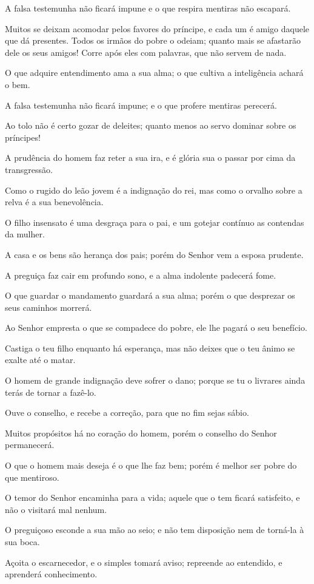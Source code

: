 A falsa testemunha não ficará impune e o que respira mentiras não
escapará.

Muitos se deixam acomodar pelos favores do príncipe, e cada um é
amigo daquele que dá presentes. Todos os irmãos do pobre o
odeiam; quanto mais se afastarão dele os seus amigos! Corre após
eles com palavras, que não servem de nada.

O que adquire entendimento ama a sua alma; o que cultiva a
inteligência achará o bem.

A falsa testemunha não ficará impune; e o que profere mentiras
perecerá.

Ao tolo não é certo gozar de deleites; quanto menos ao servo
dominar sobre os príncipes!

A prudência do homem faz reter a sua ira, e é glória sua o passar
por cima da transgressão.

Como o rugido do leão jovem é a indignação do rei, mas como o
orvalho sobre a relva é a sua benevolência.

O filho insensato é uma desgraça para o pai, e um gotejar
contínuo as contendas da mulher.

A casa e os bens são herança dos pais; porém do Senhor vem a
esposa prudente.

A preguiça faz cair em profundo sono, e a alma indolente padecerá
fome.

O que guardar o mandamento guardará a sua alma; porém o que
desprezar os seus caminhos morrerá.

Ao Senhor empresta o que se compadece do pobre, ele lhe pagará o
seu benefício.

Castiga o teu filho enquanto há esperança, mas não deixes que o
teu ânimo se exalte até o matar.

O homem de grande indignação deve sofrer o dano; porque se tu o
livrares ainda terás de tornar a fazê-lo.

Ouve o conselho, e recebe a correção, para que no fim sejas
sábio.

Muitos propósitos há no coração do homem, porém o conselho do
Senhor permanecerá.

O que o homem mais deseja é o que lhe faz bem; porém é melhor ser
pobre do que mentiroso.

O temor do Senhor encaminha para a vida; aquele que o tem ficará
satisfeito, e não o visitará mal nenhum.

O preguiçoso esconde a sua mão ao seio; e não tem disposição nem
de torná-la à sua boca.

Açoita o escarnecedor, e o simples tomará aviso; repreende ao
entendido, e aprenderá conhecimento.

